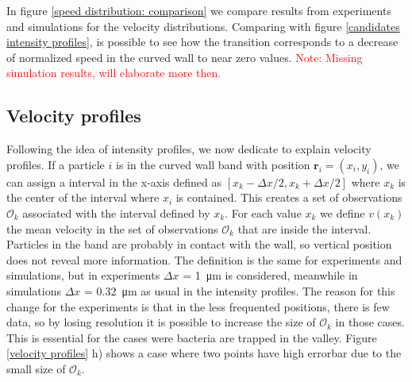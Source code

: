 
In figure \ref{speed distribution: comparison} we compare results from experiments and simulations for the velocity distributions. Comparing with figure \ref{candidates intensity profiles}, is possible to see how the transition corresponds to a decrease of normalized speed in the curved wall to near zero values. \textcolor{red}{Note: Missing simulation results, will elaborate more then.}

\subsection{Velocity profiles}

Following the idea of intensity profiles, we now dedicate to explain velocity profiles. If a particle $i$ is in the curved wall band with position $\textbf{r}_i =(x_i, y_i)$, we can assign a interval in the x-axis defined as $[x_k-\Delta x/2,x_k+\Delta x/2]$ where $x_k$ is the center of the interval where $x_i$ is contained. This creates a set of observations $\mathcal{O}_k$ associated with the interval defined by $x_k$. For each value $x_k$ we define $v(x_k)$ the mean velocity in the set of observations $\mathcal{O}_k$ that are inside the interval. Particles in the band are probably in contact with the wall, so vertical position does not reveal more information. The definition is the same for experiments and simulations, but in experiments $\Delta x $ = \SI{1}{\micro\meter} is considered, meanwhile in simulations $\Delta x $ = \SI{0.32}{\micro\meter} as usual in the intensity profiles. The reason for this change for the experiments is that in the less frequented positions, there is few data, so by losing resolution it is possible to increase the size of $\mathcal{O}_k$ in those cases. This is essential for the cases were bacteria are trapped in the valley. Figure \ref{velocity profiles} h) shows a case where two points have high errorbar due to the small size of $\mathcal{O}_k$. 

